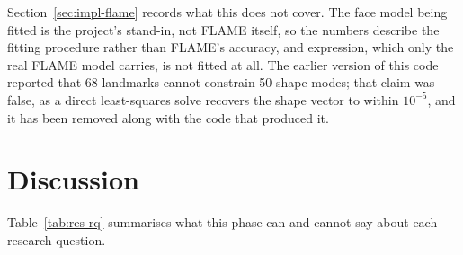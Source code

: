 Section~\ref{sec:impl-flame} records what this does not cover. The face model being fitted is the project's stand-in, not FLAME itself, so the numbers describe the fitting procedure rather than FLAME's accuracy, and expression, which only the real FLAME model carries, is not fitted at all. The earlier version of this code reported that 68 landmarks cannot constrain 50 shape modes; that claim was false, as a direct least-squares solve recovers the shape vector to within $10^{-5}$, and it has been removed along with the code that produced it.

\section{Discussion}
Table~\ref{tab:res-rq} summarises what this phase can and cannot say about each research question.

